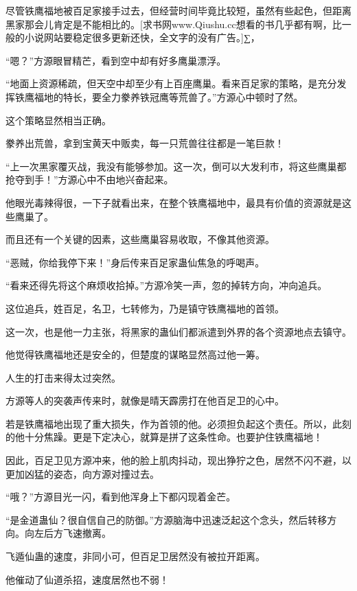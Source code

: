 
\begin{this_body}

尽管铁鹰福地被百足家接手过去，但经营时间毕竟比较短，虽然有些起色，但距离黑家那会儿肯定是不能相比的。[求书网www.Qiushu.cc想看的书几乎都有啊，比一般的小说网站要稳定很多更新还快，全文字的没有广告。]∑，

“嗯？”方源眼冒精芒，看到空中却有好多鹰巢漂浮。

“地面上资源稀疏，但天空中却至少有上百座鹰巢。看来百足家的策略，是充分发挥铁鹰福地的特长，要全力豢养铁冠鹰等荒兽了。”方源心中顿时了然。

这个策略显然相当正确。

豢养出荒兽，拿到宝黄天中贩卖，每一只荒兽往往都是一笔巨款！

“上一次黑家覆灭战，我没有能够参加。这一次，倒可以大发利市，将这些鹰巢都抢夺到手！”方源心中不由地兴奋起来。

他眼光毒辣得很，一下子就看出来，在整个铁鹰福地中，最具有价值的资源就是这些鹰巢了。

而且还有一个关键的因素，这些鹰巢容易收取，不像其他资源。

“恶贼，你给我停下来！”身后传来百足家蛊仙焦急的呼喝声。

“看来还得先将这个麻烦收拾掉。”方源冷笑一声，忽的掉转方向，冲向追兵。

这位追兵，姓百足，名卫，七转修为，乃是镇守铁鹰福地的首领。

这一次，也是他一力主张，将黑家的蛊仙们都派遣到外界的各个资源地点去镇守。

他觉得铁鹰福地还是安全的，但楚度的谋略显然高过他一筹。

人生的打击来得太过突然。

方源等人的突袭声传来时，就像是晴天霹雳打在他百足卫的心中。

若是铁鹰福地出现了重大损失，作为首领的他。必须担负起这个责任。所以，此刻的他十分焦躁。更是下定决心，就算是拼了这条性命。也要护住铁鹰福地！

因此，百足卫见方源冲来，他的脸上肌肉抖动，现出狰狞之色，居然不闪不避，以更加凶猛的姿态，向方源对撞过去。

“哦？”方源目光一闪，看到他浑身上下都闪现着金芒。

“是金道蛊仙？很自信自己的防御。”方源脑海中迅速泛起这个念头，然后转移方向。向左后方飞速撤离。

飞遁仙蛊的速度，非同小可，但百足卫居然没有被拉开距离。

他催动了仙道杀招，速度居然也不弱！


\end{this_body}
